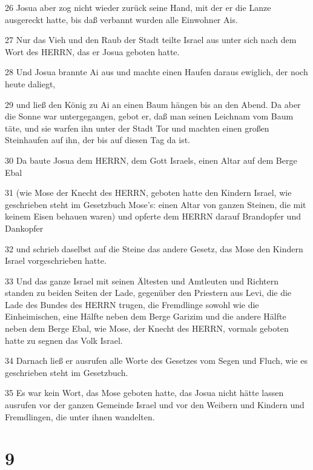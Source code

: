 \par 26 Josua aber zog nicht wieder zurück seine Hand, mit der er die Lanze ausgereckt hatte, bis daß verbannt wurden alle Einwohner Ais.
\par 27 Nur das Vieh und den Raub der Stadt teilte Israel aus unter sich nach dem Wort des HERRN, das er Josua geboten hatte.
\par 28 Und Josua brannte Ai aus und machte einen Haufen daraus ewiglich, der noch heute daliegt,
\par 29 und ließ den König zu Ai an einen Baum hängen bis an den Abend. Da aber die Sonne war untergegangen, gebot er, daß man seinen Leichnam vom Baum täte, und sie warfen ihn unter der Stadt Tor und machten einen großen Steinhaufen auf ihn, der bis auf diesen Tag da ist.
\par 30 Da baute Josua dem HERRN, dem Gott Israels, einen Altar auf dem Berge Ebal
\par 31 (wie Mose der Knecht des HERRN, geboten hatte den Kindern Israel, wie geschrieben steht im Gesetzbuch Mose's: einen Altar von ganzen Steinen, die mit keinem Eisen behauen waren) und opferte dem HERRN darauf Brandopfer und Dankopfer
\par 32 und schrieb daselbst auf die Steine das andere Gesetz, das Mose den Kindern Israel vorgeschrieben hatte.
\par 33 Und das ganze Israel mit seinen Ältesten und Amtleuten und Richtern standen zu beiden Seiten der Lade, gegenüber den Priestern aus Levi, die die Lade des Bundes des HERRN trugen, die Fremdlinge sowohl wie die Einheimischen, eine Hälfte neben dem Berge Garizim und die andere Hälfte neben dem Berge Ebal, wie Mose, der Knecht des HERRN, vormals geboten hatte zu segnen das Volk Israel.
\par 34 Darnach ließ er ausrufen alle Worte des Gesetzes vom Segen und Fluch, wie es geschrieben steht im Gesetzbuch.
\par 35 Es war kein Wort, das Mose geboten hatte, das Josua nicht hätte lassen ausrufen vor der ganzen Gemeinde Israel und vor den Weibern und Kindern und Fremdlingen, die unter ihnen wandelten.

\chapter{9}

